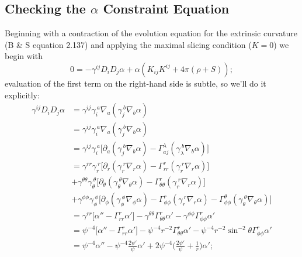 \documentclass[12pt]{article}
\numberwithin{equation}{section}
\begin{document}
\subsection{Checking the $\alpha$ Constraint Equation}
Beginning with a contraction of the evolution equation for the extrinsic curvature (B \& S equation 2.137) and applying the maximal slicing condition ($K = 0$) we begin with
\begin{equation}
0 = - \gamma^{ij} D_i D_j \alpha + \alpha (K_{ij} K^{ij} + 4 \pi (\rho + S));
\end{equation}
evaluation of the first term on the right-hand side is subtle, so we'll do it explicitly:
\begin{equation}
\begin{aligned}
\gamma^{ij} D_i D_j \alpha &= \gamma^{ij} \gamma_{i}^{~a} \nabla_a (\gamma_{j}^{~b} \nabla_b \alpha) \\
&= \gamma^{ij} \gamma_{i}^{~a} \nabla_a (\gamma_{j}^{~b} \nabla_b \alpha) \\
&= \gamma^{ij} \gamma_{i}^{~a} \Big[ \partial_a (\gamma_{j}^{~b} \nabla_b \alpha) - \Gamma^{\lambda}_{a j} (\gamma_{\lambda}^{~b} \nabla_b \alpha) \Big] \\
&= \gamma^{rr} \gamma_{r}^{~r} \Big[ \partial_r (\gamma_{r}^{~r} \nabla_r \alpha) - \Gamma^{r}_{r r} (\gamma_{r}^{~r} \nabla_r \alpha) \Big] \\
&+ \gamma^{\theta \theta} \gamma_{\theta}^{~\theta} \Big[ \partial_\theta (\gamma_{\theta}^{~\theta} \nabla_\theta \alpha) - \Gamma^{r}_{\theta \theta} (\gamma_{r}^{~r} \nabla_r \alpha) \Big] \\
&+ \gamma^{\phi \phi} \gamma_{\phi}^{~\phi} \Big[ \partial_\phi (\gamma_{\phi}^{~\phi} \nabla_\phi \alpha) - \Gamma^{r}_{\phi \phi} (\gamma_{r}^{~r} \nabla_r \alpha) - \Gamma^{\theta}_{\phi \phi} (\gamma_{\theta}^{~\theta} \nabla_\theta \alpha) \Big] \\
&= \gamma^{rr} \Big[ \alpha'' - \Gamma^{r}_{r r} \alpha' \Big] - \gamma^{\theta \theta} \Gamma^{r}_{\theta \theta} \alpha' - \gamma^{\phi \phi} \Gamma^{r}_{\phi \phi} \alpha' \\
&= \psi^{-4} \Big[ \alpha'' - \Gamma^{r}_{r r} \alpha' \Big] - \psi^{-4} r^{-2} \Gamma^{r}_{\theta \theta} \alpha' - \psi^{-4} r^{-2} \sin^{-2} \theta \Gamma^{r}_{\phi \phi} \alpha' \\
&= \psi^{-4} \alpha'' - \psi^{-4} \frac{2 \psi'}{\psi} \alpha' + 2 \psi^{-4} \Big( \frac{2 \psi'}{\psi} + \frac{1}{r} \Big) \alpha'; \\
\end{aligned}
\end{equation}
\end{document}
